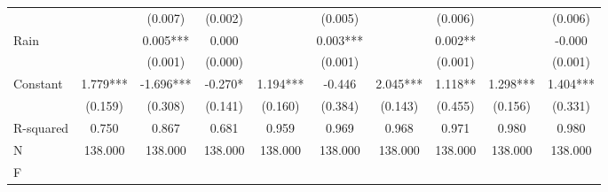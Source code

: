 {\begin{tabular}{l*{9}{c}}
                    &               &     (0.007)   &     (0.002)   &               &     (0.005)   &               &     (0.006)   &               &     (0.006)   \\
Rain                &               &       0.005***&       0.000   &               &       0.003***&               &       0.002** &               &      -0.000   \\
                    &               &     (0.001)   &     (0.000)   &               &     (0.001)   &               &     (0.001)   &               &     (0.001)   \\
Constant            &       1.779***&      -1.696***&      -0.270*  &       1.194***&      -0.446   &       2.045***&       1.118** &       1.298***&       1.404***\\
                    &     (0.159)   &     (0.308)   &     (0.141)   &     (0.160)   &     (0.384)   &     (0.143)   &     (0.455)   &     (0.156)   &     (0.331)   \\
\hline
R-squared           &       0.750   &       0.867   &       0.681   &       0.959   &       0.969   &       0.968   &       0.971   &       0.980   &       0.980   \\
N                   &     138.000   &     138.000   &     138.000   &     138.000   &     138.000   &     138.000   &     138.000   &     138.000   &     138.000   \\
F                   &               &               &               &               &               &               &               &               &               \\
\hline\hline
\end{tabular}
}

